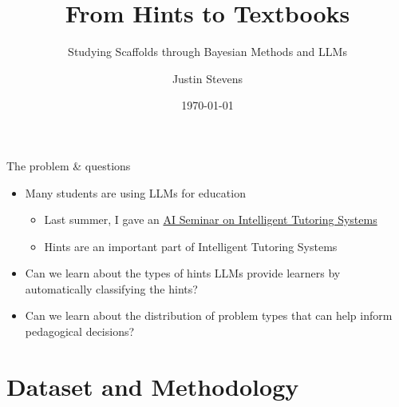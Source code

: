 \documentclass[10pt,aspectratio=169]{beamer}
\title[From Hints to Textbooks]{From Hints to Textbooks}
\subtitle{Studying Scaffolds through Bayesian Methods and LLMs}
\author{Justin Stevens}
\institute{Amii Team Time Talks}
\date{\today}
\begin{document}
\begin{frame}
  \titlepage
\end{frame}

\begin{frame}{The problem \& questions }
\begin{itemize}
    \item Many students are using LLMs for education 
    \begin{itemize} 
    \item Last summer, I gave an \href{https://www.youtube.com/watch?v=ECm2GY9uZN8}{AI Seminar on Intelligent Tutoring Systems}
    \item Hints are an important part of Intelligent Tutoring Systems
    \end{itemize} 
    \medskip  
    \item Can we learn about the types of hints LLMs provide learners by automatically classifying the hints?
    \medskip  
    \item Can we learn about the distribution of problem types that can help inform pedagogical decisions?
\end{itemize}
\end{frame}

\section{Dataset and Methodology}
\end{document}
